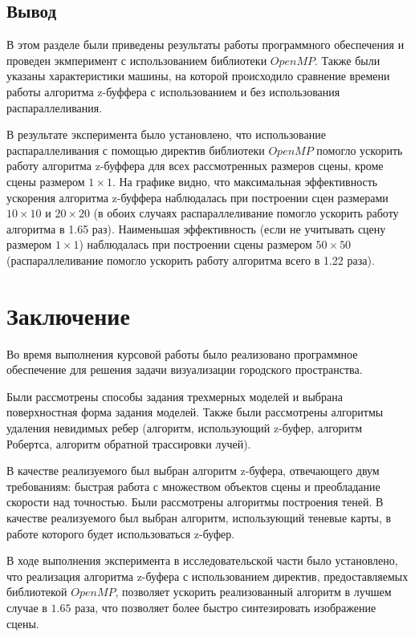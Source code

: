 \documentclass[a4paper,14pt, unknownkeysallowed]{extreport}
\begin{document}
\clearpage

\section{Вывод}


В этом разделе были приведены результаты работы программного обеспечения и проведен экмперимент с использованием библиотеки $OpenMP$. Также были указаны характеристики машины, на которой происходило сравнение времени работы алгоритма z-буффера с использованием и без использования распараллеливания.

В результате эксперимента было установлено, что использование распараллеливания с помощью директив библиотеки $OpenMP$ помогло ускорить работу алгоритма z-буффера для всех рассмотренных размеров сцены, кроме сцены размером $1\times1$. На графике видно, что максимальная эффективность ускорения алгоритма z-буффера наблюдалась при построении сцен размерами $10\times10$ и $20\times20$ (в обоих случаях распараллеливание помогло ускорить работу алгоритма в 1.65 раз). Наименьшая эффективность (если не учитывать сцену размером $1\times1$) наблюдалась при построении сцены размером $50\times50$ (распараллеливание помогло ускорить работу алгоритма всего в 1.22 раза).


\chapter*{Заключение}

Во время выполнения курсовой работы было реализовано программное обеспечение для решения задачи визуализации городского пространства. 

Были рассмотрены способы задания трехмерных моделей и выбрана поверхностная форма задания моделей. Также были рассмотрены алгоритмы удаления невидимых ребер (алгоритм, использующий z-буфер, алгоритм Робертса, алгоритм обратной трассировки лучей).

В качестве реализуемого был выбран алгоритм z-буфера, отвечающего двум требованиям: быстрая работа с множеством объектов сцены и преобладание скорости над точностью. Были рассмотрены алгоритмы построения теней. В качестве реализуемого был выбран алгоритм, использующий теневые карты, в работе которого будет использоваться z-буфер.

В ходе выполнения эксперимента в исследовательской части было установлено, что реализация алгоритма z-буфера с использованием директив, предоставляемых библиотекой $OpenMP$, позволяет ускорить реализованный алгоритм в лучшем случае в $1.65$ раза, что позволяет более быстро синтезировать изображение сцены.
\end{document}
